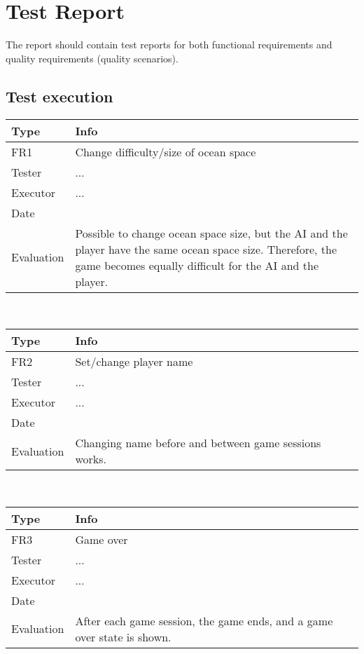 \chapter{Test Report}

The report should contain test reports for both functional requirements and quality requirements (quality scenarios).

\section{Test execution}

\begin{tabular}{|l|l|}
	\hline
	\bf{Type}	& \bf{Info} \\
	\hline
	FR1			& Change difficulty/size of ocean space \\
	Tester		& ... \\
	Executor	& ... \\
	Date		& \date{\today} \\
	Evaluation	& Possible to change ocean space size, but the AI and the player have the same ocean space size. Therefore, the game becomes equally difficult for the AI and the player.\\
	\hline
\end{tabular}
\\
\begin{tabular}{|l|l|}
	\hline
	\bf{Type}	& \bf{Info} \\
	\hline
	FR2			& Set/change player name \\
	Tester		& ... \\
	Executor	& ... \\
	Date		& \date{\today} \\
	Evaluation	& Changing name before and between game sessions works. \\
	\hline
\end{tabular}
\\
\begin{tabular}{|l|l|}
	\hline
	\bf{Type}	& \bf{Info} \\
	\hline
	FR3			& Game over \\
	Tester		& ... \\
	Executor	& ... \\
	Date		& \date{\today} \\
	Evaluation	& After each game session, the game ends, and a game over state is shown. \\
	\hline
\end{tabular}
\\
